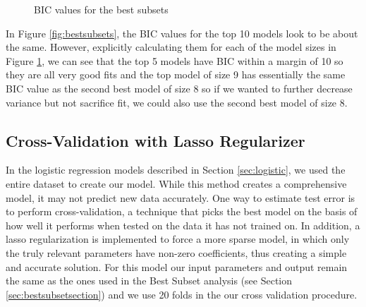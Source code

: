\documentclass{article}
\begin{document}
\begin{figure}[H]
\begin{minipage}{0.45\textwidth}
		\caption{BIC values for the best subsets}
		\label{fig:BICsort}
	\end{minipage}
\end{figure}

In Figure \ref{fig:bestsubsets}, the BIC values for the top 10 models look to be about the same.  However, explicitly calculating them for each of the model sizes in Figure \ref{fig:BICsort}, we can see that the top 5 models have BIC within a margin of 10 so they are all very good fits and the top model of size 9 has essentially the same BIC value as the second best model of size 8 so if we wanted to further decrease variance but not sacrifice fit, we could also use the second best model of size 8.
%
\subsection{Cross-Validation with Lasso Regularizer}
In the logistic regression models described in Section \ref{sec:logistic}, we used the entire dataset to create our model.  While this method creates a comprehensive model, it may not predict new data accurately.  One way to estimate test error is to perform cross-validation, a technique that picks the best model on the basis of how well it performs when tested on the data it has not trained on. In addition, a lasso regularization is implemented to force a more sparse model, in which only the truly relevant parameters have non-zero coefficients, thus creating a simple and accurate solution.  For this model our input parameters and output remain the same as the ones used in the Best Subset analysis (see Section \ref{sec:bestsubsetsection}) and we use 20 folds in the our cross validation procedure.\\
\null\\
\end{document}
